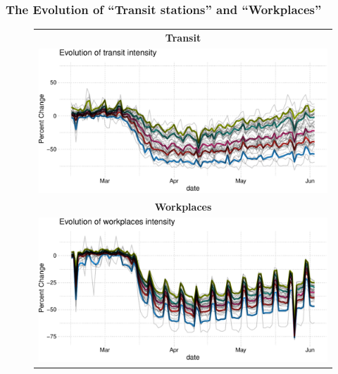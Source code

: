 \documentclass{beamer}
\begin{document}
\begin{frame}
  \frametitle{The Evolution of  ``Transit stations'' and ``Workplaces''}\vspace{-0.2cm}
\begin{figure} %
  \begin{minipage}{\linewidth}
    \begin{tabular}{c}
    \textbf{Transit}\\
      \includegraphics[width=0.6\linewidth]{../tables_and_figures/transit}\\ 
      \textbf{Workplaces}\\
      \includegraphics[width=0.6\linewidth]{../tables_and_figures/workplaces}
       \end{tabular}
       \end{minipage}
        \begin{flushleft}
      \end{flushleft}
\end{figure}
   
\end{frame}


\end{document}
